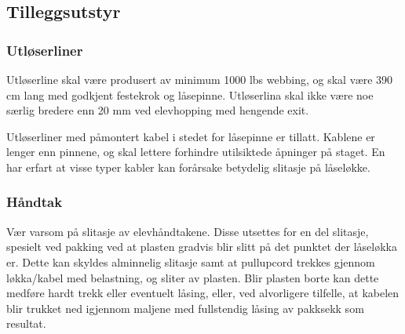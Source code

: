 \subsection{Tilleggsutstyr}
\subsubsection{Utløserliner}
Utløserline skal være produsert av minimum 1000 lbs webbing, og skal være 390 cm lang med godkjent festekrok og låsepinne. Utløserlina skal ikke være noe særlig bredere enn 20 mm ved elevhopping med hengende exit.

Utløserliner med påmontert kabel i stedet for låsepinne er tillatt. Kablene er lenger enn pinnene, og skal lettere forhindre utilsiktede åpninger på staget. En har erfart at visse typer kabler kan forårsake betydelig slitasje på låseløkke.

\subsubsection{Håndtak}
Vær varsom på slitasje av elevhåndtakene. Disse utsettes for en del slitasje, spesielt ved pakking ved at plasten gradvis blir slitt på det punktet der låseløkka er. Dette kan skyldes alminnelig slitasje samt at pullupcord trekkes gjennom løkka/kabel med belastning, og sliter av plasten. Blir plasten borte kan dette medføre hardt trekk eller eventuelt låsing, eller, ved alvorligere tilfelle, at kabelen blir trukket ned igjennom maljene med fullstendig låsing av pakksekk som resultat.
